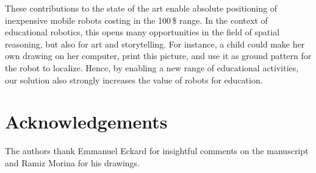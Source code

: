 \documentclass[letterpaper, 10pt, conference]{ieeeconf}
\begin{document}
These contributions to the state of the art enable absolute positioning of inexpensive mobile robots costing in the 100\,\$ range.
In the context of educational robotics, this opens many opportunities in the field of spatial reasoning, but also for art and storytelling.
For instance, a child could make her own drawing on her computer, print this picture, and use it as ground pattern for the robot to localize.
Hence, by enabling a new range of educational activities, our solution also strongly increases the value of robots for education.

\section{Acknowledgements}

The authors thank Emmanuel Eckard for insightful comments on the manuscript and Ramiz Morina for his drawings.



\end{document}
